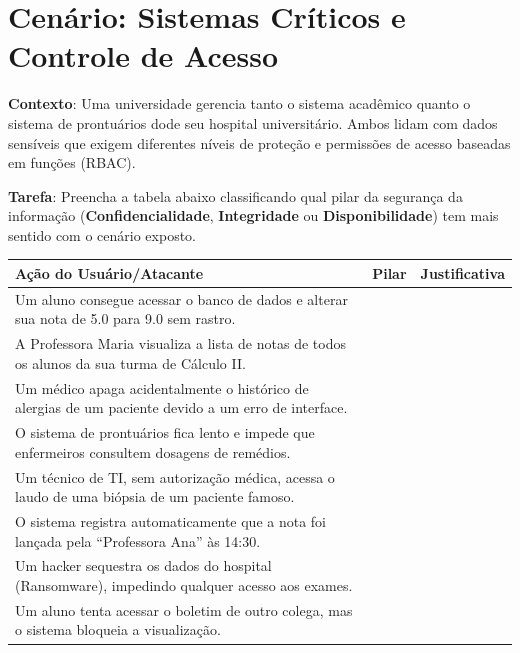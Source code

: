 \section{Cenário: Sistemas Críticos e Controle de Acesso}

\textbf{Contexto}:
Uma universidade gerencia tanto o sistema acadêmico  quanto o sistema de prontuários dode seu hospital universitário. Ambos lidam com dados sensíveis que exigem diferentes níveis de proteção e permissões de acesso baseadas em funções (RBAC).

\textbf{Tarefa}:
Preencha a tabela abaixo classificando qual pilar da segurança da informação (\textbf{Confidencialidade}, \textbf{Integridade} ou \textbf{Disponibilidade}) tem mais sentido com o cenário exposto.

\begin{table}[h!]
    \centering
    \renewcommand{\arraystretch}{1.5}
    \begin{tabular}{|p{6cm}|p{3cm}|p{6cm}|}
        \hline
        \textbf{Ação do Usuário/Atacante}                                                                    & \textbf{Pilar} & \textbf{Justificativa} \\ \hline
        Um aluno consegue acessar o banco de dados e alterar sua nota de 5.0 para 9.0 sem rastro.            &                &                        \\ \hline
        A Professora Maria visualiza a lista de notas de todos os alunos da sua turma de Cálculo II.         &                &                        \\ \hline
        Um médico apaga acidentalmente o histórico de alergias de um paciente devido a um erro de interface. &                &                        \\ \hline
        O sistema de prontuários fica lento e impede que enfermeiros consultem dosagens de remédios.         &                &                        \\ \hline
        Um técnico de TI, sem autorização médica, acessa o laudo de uma biópsia de um paciente famoso.       &                &                        \\ \hline
        O sistema registra automaticamente que a nota foi lançada pela ``Professora Ana'' às 14:30.          &                &                        \\ \hline
        Um hacker sequestra os dados do hospital (Ransomware), impedindo qualquer acesso aos exames.         &                &                        \\ \hline
        Um aluno tenta acessar o boletim de outro colega, mas o sistema bloqueia a visualização.             &                &                        \\ \hline
    \end{tabular}
\end{table}

